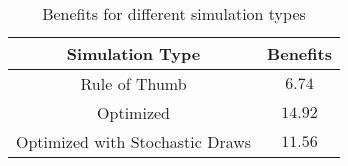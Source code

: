 \begin{table}[h!]
\centering
\begin{tabular}{|c|c|}
\hline
Simulation Type & Benefits \\ 
\hline
Rule of Thumb & $6.74$ \\ 
Optimized & $14.92$ \\ 
Optimized with Stochastic Draws & $11.56$ \\ 
\hline
\end{tabular}
\caption{Benefits for different simulation types}
\end{table}
